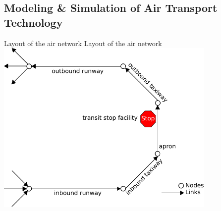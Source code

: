 \subsection{Modeling \& Simulation of Air Transport Technology}
\label{sec:modeling-of-technology}
%
%
%
\createfigure%
{Layout of the air network}%
{Layout of the air network}%
{\label{fig:air_network}}%
{\includegraphics[width=0.8\textwidth]{extending/figures/air/sf_flight_model_airport.pdf}}%
